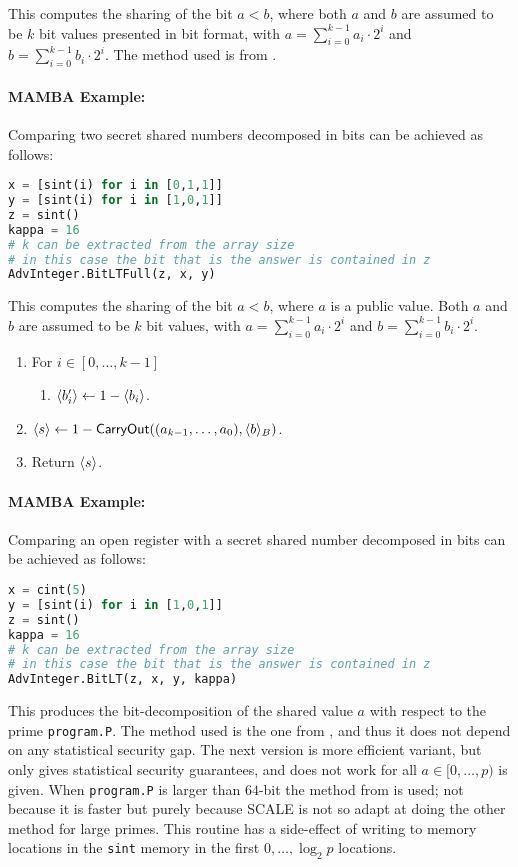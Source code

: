 This computes the sharing of the bit $a<b$, where both $a$ and $b$ are
assumed to be $k$ bit values presented in bit format, with
$a=\sum_{i=0}^{k-1} a_i \cdot 2^i$ and
$b=\sum_{i=0}^{k-1} b_i \cdot 2^i$.
The method used is from \cite{DFKNT06}.
\paragraph{MAMBA Example:} Comparing two secret shared numbers decomposed in bits can be achieved as follows:
\begin{lstlisting}[language={python}]
x = [sint(i) for i in [0,1,1]]
y = [sint(i) for i in [1,0,1]]
z = sint()
kappa = 16
# k can be extracted from the array size
# in this case the bit that is the answer is contained in z
AdvInteger.BitLTFull(z, x, y)
\end{lstlisting}

This computes the sharing of the bit $a<b$, where $a$ is a public value.
Both $a$ and $b$ are assumed to be $k$ bit values, with
$a=\sum_{i=0}^{k-1} a_i \cdot 2^i$ and 
$b=\sum_{i=0}^{k-1} b_i \cdot 2^i$.
\begin{enumerate}
\item For $i \in [0,\ldots,k-1]$
\begin{enumerate}
   \item $\langle b_i' \rangle\leftarrow 1-\langle b_i \rangle$.
\end{enumerate}
\item $\langle s \rangle \leftarrow 1- 
	\mathsf{CarryOut}((a_{k-1},\ldots,a_0),\langle b \rangle_B)$.
\item Return $\langle s \rangle$.
\end{enumerate}
\paragraph{MAMBA Example:} Comparing an open register with a secret shared number decomposed in bits can be achieved as follows: 
\begin{lstlisting}[language={python}]
x = cint(5)
y = [sint(i) for i in [1,0,1]]
z = sint()
kappa = 16
# k can be extracted from the array size
# in this case the bit that is the answer is contained in z
AdvInteger.BitLT(z, x, y, kappa)
\end{lstlisting}


This produces the bit-decomposition of the shared value $a$ with
respect to the prime \verb+program.P+.
The method used is the one from \cite{DBLP:conf/pkc/NishideO07},
and thus it does not depend on any statistical security gap.
The next version is more efficient variant, but only
gives statistical security guarantees, and does not
work for all $a \in [0,\ldots,p)$ is given.
When \verb+program.P+ is larger than $64$-bit the
method from \cite{DFKNT06} is used; not because it is
faster but purely because SCALE is not so adapt at doing
the other method for large primes.
This routine has a side-effect of writing to memory locations in the
\verb+sint+ memory in the first $0,\ldots,\log_2 p$ locations.
